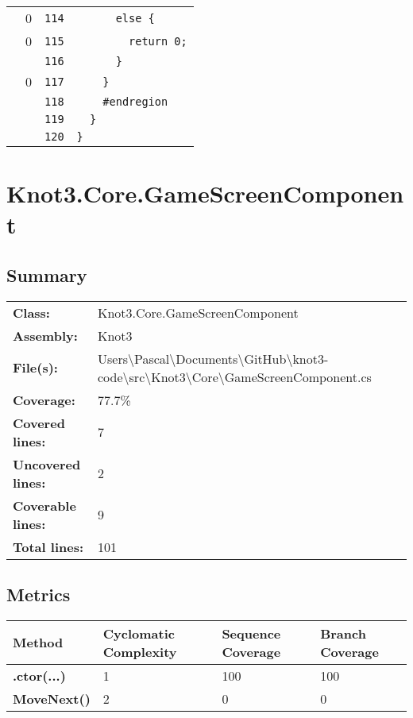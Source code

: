 \documentclass[a4paper,10pt]{article}
\begin{document}
\begin{longtable}[l]{lrrl}
\cellcolor{red} & 0 & \verb~114~ & \verb~      else {~\\
\cellcolor{red} & 0 & \verb~115~ & \verb~        return 0;~\\
\cellcolor{gray} &  & \verb~116~ & \verb~      }~\\
\cellcolor{red} & 0 & \verb~117~ & \verb~    }~\\
\cellcolor{gray} &  & \verb~118~ & \verb~    #endregion~\\
\cellcolor{gray} &  & \verb~119~ & \verb~  }~\\
\cellcolor{gray} &  & \verb~120~ & \verb~}~\\
\end{longtable}
\newpage
\section{Knot3.Core.GameScreenComponent}
\subsection{Summary}
\begin{longtable}[l]{ll}
\textbf{Class:} & Knot3.Core.GameScreenComponent\\
\textbf{Assembly:} & Knot3\\
\textbf{File(s):} & \begin{minipage}[t]{12cm}{Users\textbackslash Pascal\textbackslash Documents\textbackslash GitHub\textbackslash knot3-code\textbackslash src\textbackslash Knot3\textbackslash Core\textbackslash GameScreenComponent.cs}\end{minipage} \\
\textbf{Coverage:} & 77.7\%\\
\textbf{Covered lines:} & 7\\
\textbf{Uncovered lines:} & 2\\
\textbf{Coverable lines:} & 9\\
\textbf{Total lines:} & 101\\
\end{longtable}
\subsection{Metrics}
\begin{longtable}[l]{|l|l|l|l|}
\hline
\textbf{Method} & \textbf{Cyclomatic Complexity} & \textbf{Sequence Coverage} & \textbf{Branch Coverage}\\
\hline
\textbf{.ctor(...)} & 1 & 100 & 100\\
\hline
\textbf{MoveNext()} & 2 & 0 & 0\\
\hline
\end{longtable}
\end{document}
